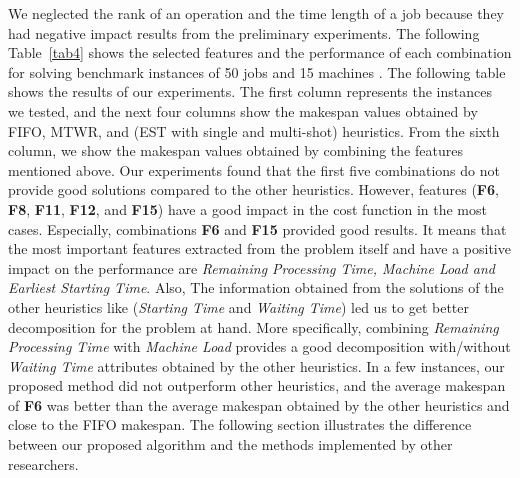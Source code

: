 \documentclass[runningheads]{llncs}
\begin{document}
We neglected the rank of an operation and the time length of a job because they had negative impact results from the preliminary experiments. The following Table~\ref{tab4} shows the selected features and the performance of each combination for solving benchmark instances of 50 jobs and 15 machines \cite{taillard1993benchmarks}. The following table shows the results of our experiments. The first column represents the instances we tested, and the next four columns show the makespan values obtained by FIFO, MTWR, and (EST with single and multi-shot) heuristics. From the sixth column, we show the makespan values obtained by combining the features mentioned above. Our experiments found that the first five combinations do not provide good solutions compared to the other heuristics. However, features (\textbf{F6}, \textbf{F8}, \textbf{F11}, \textbf{F12}, and \textbf{F15}) have a good impact in the cost function in the most cases. Especially, combinations \textbf{F6} and \textbf{F15} provided good results. It means that the most important features extracted from the problem itself and have a positive impact on the performance are \textit{Remaining Processing Time, Machine Load and Earliest Starting Time}. Also, The information obtained from the solutions of the other heuristics like (\textit{Starting Time} and \textit{Waiting Time}) led us to get better decomposition for the problem at hand. More specifically, combining \textit{Remaining Processing Time} with \textit{Machine Load} provides a good decomposition with/without \textit{Waiting Time} attributes obtained by the other heuristics. In a few instances, our proposed method did not outperform other heuristics, and the average makespan of \textbf{F6} was better than the average makespan obtained by the other heuristics and close to the FIFO makespan. The following section illustrates the difference between our proposed algorithm and the methods implemented by other researchers.
\end{document}
